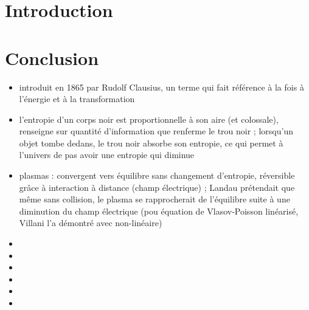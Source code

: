 


\biblio{}

\section*{Introduction}

\section{}
\section{}
\section{}


\section*{Conclusion}



\begin{remarques} \begin{itemize} 
\item introduit en 1865 par Rudolf Clausius, un terme qui fait référence à la fois à l'énergie et à la transformation
\item l'entropie d'un corps noir est proportionnelle à son aire (et colossale), renseigne sur quantité d'information que renferme le trou noir ; lorsqu'un objet tombe dedans, le trou noir absorbe son entropie, ce qui permet à l'univers de pas avoir une entropie qui diminue
\item plasmas : convergent vers équilibre sans changement d'entropie, réversible grâce à interaction à distance (champ électrique) ; Landau prétendait que même sans collision, le plasma se rapprocherait de l’équilibre suite à une diminution du champ électrique (pou équation de Vlasov-Poisson linéarisé, Villani l'a démontré avec non-linéaire)
\item 
\item 
\item 
\item 
\item 
\item 
\end{itemize} \end{remarques}